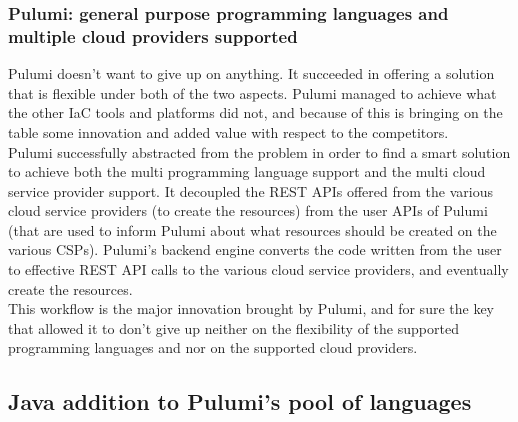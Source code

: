 \subsubsection{Pulumi: general purpose programming languages and multiple cloud providers supported}
Pulumi doesn't want to give up on anything.
It succeeded in offering a solution that is flexible under both of the two aspects.
Pulumi managed to achieve what the other IaC tools and platforms did not, and because of this is bringing on the table some innovation and added value with respect to the competitors.\\
Pulumi successfully abstracted from the problem in order to find a smart solution to achieve both the multi programming language support and the multi cloud service provider support.
It decoupled the REST APIs offered from the various cloud service providers (to create the resources) from the user APIs of Pulumi (that are used to inform Pulumi about what resources should be created on the various CSPs).
Pulumi's backend engine converts the code written from the user to effective REST API calls to the various cloud service providers, and eventually create the resources.\\
This workflow is the major innovation brought by Pulumi, and for sure the key that allowed it to don't give up neither on the flexibility of the supported programming languages and nor on the supported cloud providers.

\subsection{Java addition to Pulumi's pool of languages}

